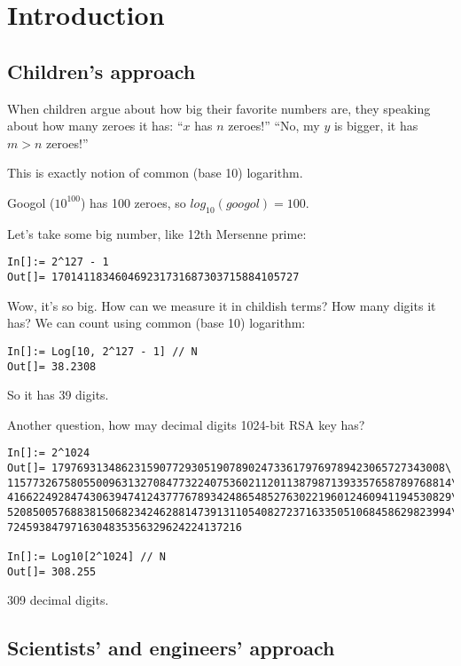 \section{Introduction}

\subsection{Children's approach}

When children argue about how big their favorite numbers are, they speaking about how many zeroes it has:
``$x$ has $n$ zeroes!''
``No, my $y$ is bigger, it has $m>n$ zeroes!''

This is exactly notion of common (base 10) logarithm.

Googol ($10^{100}$) has 100 zeroes, so $log_{10} (googol) = 100$.

Let's take some big number, like 12th Mersenne prime:

\begin{lstlisting}[caption=Wolfram Mathematica]
In[]:= 2^127 - 1
Out[]= 170141183460469231731687303715884105727
\end{lstlisting}

Wow, it's so big. How can we measure it in childish terms? How many digits it has? We can count using common (base 10) logarithm:

\begin{lstlisting}[caption=Wolfram Mathematica]
In[]:= Log[10, 2^127 - 1] // N
Out[]= 38.2308
\end{lstlisting}

So it has 39 digits.

Another question, how may decimal digits 1024-bit RSA key has?

\begin{lstlisting}[caption=Wolfram Mathematica]
In[]:= 2^1024
Out[]= 17976931348623159077293051907890247336179769789423065727343008\
1157732675805500963132708477322407536021120113879871393357658789768814\
4166224928474306394741243777678934248654852763022196012460941194530829\
5208500576883815068234246288147391311054082723716335051068458629823994\
7245938479716304835356329624224137216

In[]:= Log10[2^1024] // N
Out[]= 308.255
\end{lstlisting}

309 decimal digits.

\subsection{Scientists' and engineers' approach}

